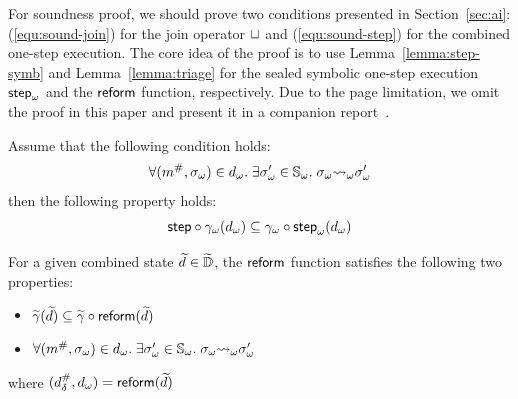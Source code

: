 For soundness proof, we should prove 
two conditions presented in Section~\ref{sec:ai}:
(\ref{equ:sound-join}) for the join operator $\sqcup$ and
(\ref{equ:sound-step}) for the combined one-step execution.
The core idea of the proof is to use Lemma~\ref{lemma:step-symb} and
Lemma~\ref{lemma:triage} for the sealed symbolic one-step execution
${\textsf{step}}_\omega$ and the $\textsf{reform}$ function, respectively. Due to the page limitation, we omit
the proof in this paper and present it in a companion report~\cite{report}.
\begin{lemma}\label{lemma:step-symb}
  Assume that the following condition holds:
  \[
    \forall ({m}^{\#}, {\sigma}_\omega) \in {{d}_\omega}. \; \exists {\sigma}_\omega' \in
    {\mathbb{S}}_\omega. \; {\sigma}_\omega {\leadsto}_\omega {\sigma}_\omega'
  \]
  then the following property holds:
  \[
    \textsf{step} \circ {\gamma}_\omega({{d}_\omega}) \subseteq
    {\gamma}_\omega \circ {\textsf{step}}_\omega({{d}_\omega})\\
  \]
\end{lemma}
\begin{lemma}\label{lemma:triage}
  For a given combined state $\widetilde{d} \in \widetilde{\mathbb{D}}$, the $\textsf{reform}$ function
  satisfies the following two properties:
  \begin{itemize}
    \item $\widetilde{\gamma}(\widetilde{d}) \subseteq \widetilde{\gamma} \circ \textsf{reform}(\widetilde{d})$
    \item $\forall ({m}^{\#}, {\sigma}_\omega) \in {{d}_\omega}. \; \exists {\sigma}_\omega' \in
      {\mathbb{S}}_\omega.  \; {\sigma}_\omega {\leadsto}_\omega {\sigma}_\omega'$
  \end{itemize}
  where $({{d}^{\#}_\delta}, {{d}_\omega}) = \textsf{reform}(\widetilde{d})$
\end{lemma}
